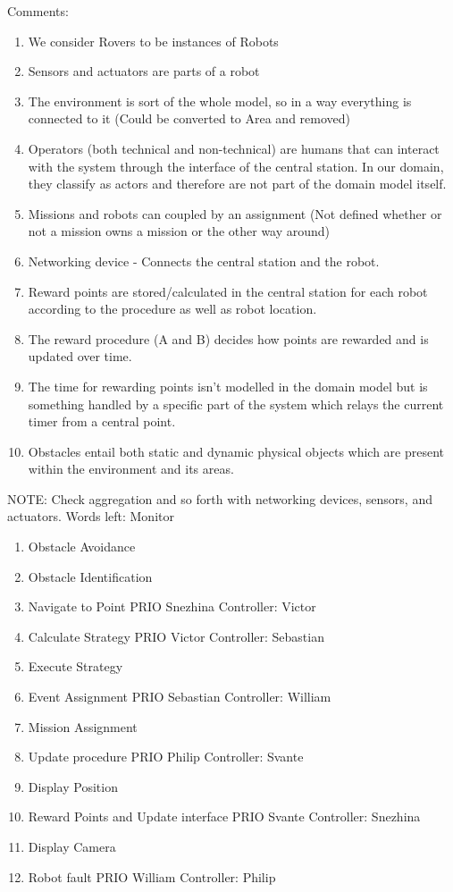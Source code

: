 Comments: \begin{enumerate}
    \item We consider Rovers to be instances of Robots
    \item Sensors and actuators are parts of a robot
    \item The environment is sort of the whole model, so in a way everything is connected to it (Could be converted to Area and removed)
    \item Operators (both technical and non-technical) are humans that can interact with the system through the interface of the central station. In our domain, they classify as actors and therefore are not part of the domain model itself.
    \item Missions and robots can coupled by an assignment (Not defined whether or not a mission owns a mission or the other way around)
    \item Networking device - Connects the central station and the robot.
    \item Reward points are stored/calculated in the central station for each robot according to the procedure as well as robot location.
    \item The reward procedure (A and B) decides how points are rewarded and is updated over time.
    \item The time for rewarding points isn't modelled in the domain model but is something handled by a specific part of the system which relays the current timer from a central point.
	\item Obstacles entail both static and dynamic physical objects which are present within the environment and its areas.
\end{enumerate} 

NOTE: Check aggregation and so forth with networking devices, sensors, and actuators.
Words left: Monitor

\begin {enumerate}
\item Obstacle Avoidance
\item Obstacle Identification
\item Navigate to Point PRIO Snezhina                   Controller: Victor
\item Calculate Strategy PRIO Victor                    Controller: Sebastian
\item Execute Strategy 
\item Event Assignment PRIO Sebastian                   Controller: William
\item Mission Assignment
\item Update procedure PRIO Philip                      Controller: Svante
\item Display Position
\item Reward Points and Update interface PRIO Svante    Controller: Snezhina
\item Display Camera 
\item Robot fault PRIO William                          Controller: Philip
\end{enumerate}